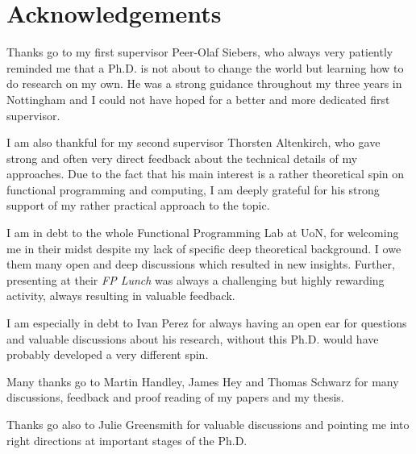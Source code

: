 \chapter*{Acknowledgements}
Thanks go to my first supervisor Peer-Olaf Siebers, who always very patiently reminded me that a Ph.D. is not about to change the world but learning how to do research on my own. He was a strong guidance throughout my three years in Nottingham and I could not have hoped for a better and more dedicated first supervisor.

I am also thankful for my second supervisor Thorsten Altenkirch, who gave strong and often very direct feedback about the technical details of my approaches. Due to the fact that his main interest is a rather theoretical spin on functional programming and computing, I am deeply grateful for his strong support of my rather practical approach to the topic.

I am in debt to the whole Functional Programming Lab at UoN, for welcoming me in their midst despite my lack of specific deep theoretical background. I owe them many open and deep discussions which resulted in new insights. Further, presenting at their \textit{FP Lunch} was always a challenging but highly rewarding activity, always resulting in valuable feedback.

I am especially in debt to Ivan Perez for always having an open ear for questions and valuable discussions about his research, without this Ph.D. would have probably developed a very different spin.

Many thanks go to Martin Handley, James Hey and Thomas Schwarz for many discussions, feedback and proof reading of my papers and my thesis.

Thanks go also to Julie Greensmith for valuable discussions and pointing me into right directions at important stages of the Ph.D.